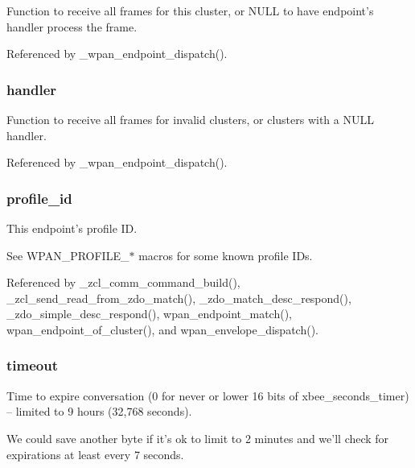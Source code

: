Function to receive all frames for this cluster, or N\-U\-L\-L to have endpoint's handler process the frame. 



Referenced by \-\_\-wpan\-\_\-endpoint\-\_\-dispatch().

\hypertarget{group__wpan__aps_ga4835da0b636ce07eedbf92aa2779a761}{
\subsubsection[{handler}]{ handler}}\label{group__wpan__aps_ga4835da0b636ce07eedbf92aa2779a761}


Function to receive all frames for invalid clusters, or clusters with a {\ttfamily N\-U\-L\-L} handler. 



Referenced by \-\_\-wpan\-\_\-endpoint\-\_\-dispatch().

\hypertarget{group__wpan__aps_ga5ca7f19e5697de2baf0e2147a41a5792}{
\subsubsection[{profile\-\_\-id}]{ profile\-\_\-id}}\label{group__wpan__aps_ga5ca7f19e5697de2baf0e2147a41a5792}


This endpoint's profile I\-D. 

See W\-P\-A\-N\-\_\-\-P\-R\-O\-F\-I\-L\-E\-\_\-$\ast$ macros for some known profile I\-Ds. 

Referenced by \-\_\-zcl\-\_\-comm\-\_\-command\-\_\-build(), \-\_\-zcl\-\_\-send\-\_\-read\-\_\-from\-\_\-zdo\-\_\-match(), \-\_\-zdo\-\_\-match\-\_\-desc\-\_\-respond(), \-\_\-zdo\-\_\-simple\-\_\-desc\-\_\-respond(), wpan\-\_\-endpoint\-\_\-match(), wpan\-\_\-endpoint\-\_\-of\-\_\-cluster(), and wpan\-\_\-envelope\-\_\-dispatch().

\hypertarget{group__wpan__aps_ga7f1ad43d3bf79b40bc39dbb5a6c3a5ae}{
\subsubsection[{timeout}]{ timeout}}\label{group__wpan__aps_ga7f1ad43d3bf79b40bc39dbb5a6c3a5ae}


Time to expire conversation (0 for never or lower 16 bits of xbee\-\_\-seconds\-\_\-timer) -- limited to 9 hours (32,768 seconds). 

We could save another byte if it's ok to limit to 2 minutes and we'll check for expirations at least every 7 seconds. 